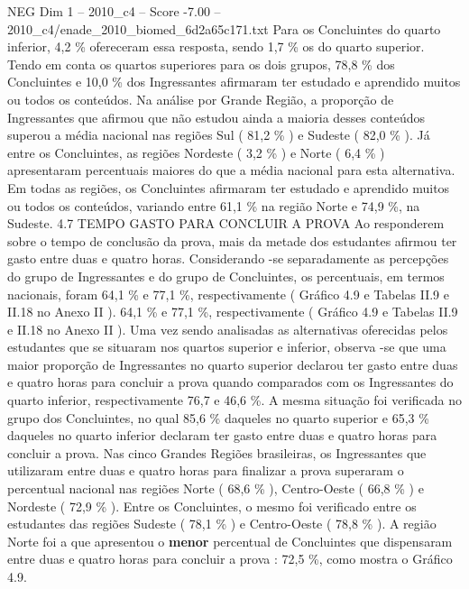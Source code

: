 \begin{textsample}{NEG Dim 1 – 2010\_c4 – Score -7.00 – 2010\_c4/enade\_2010\_biomed\_6d2a65c171.txt}
Para os Concluintes do quarto inferior, 4,2 \% ofereceram essa resposta, sendo 1,7 \% os do quarto superior.
Tendo em conta os quartos superiores para os dois grupos, 78,8 \% dos Concluintes e 10,0 \% dos Ingressantes afirmaram ter estudado e aprendido muitos ou todos os conteúdos.
Na análise por Grande Região, a proporção de Ingressantes que afirmou que não estudou ainda a maioria desses conteúdos superou a média nacional nas regiões Sul ( 81,2 \% ) e Sudeste ( 82,0 \% ).
Já entre os Concluintes, as regiões Nordeste ( 3,2 \% ) e Norte ( 6,4 \% ) apresentaram percentuais maiores do que a média nacional para esta alternativa.
Em todas as regiões, os Concluintes afirmaram ter estudado e aprendido muitos ou todos os conteúdos, variando entre 61,1 \% na região Norte e 74,9 \%, na Sudeste. 4.7 TEMPO GASTO PARA CONCLUIR A PROVA Ao responderem sobre o tempo de conclusão da prova, mais da metade dos estudantes afirmou ter gasto entre duas e quatro horas.
Considerando -se separadamente as percepções do grupo de Ingressantes e do grupo de Concluintes, os percentuais, em termos nacionais, foram 64,1 \% e 77,1 \%, respectivamente ( Gráfico 4.9 e Tabelas II.9 e II.18 no Anexo II ). 64,1 \% e 77,1 \%, respectivamente ( Gráfico 4.9 e Tabelas II.9 e II.18 no Anexo II ).
Uma vez sendo analisadas as alternativas oferecidas pelos estudantes que se situaram nos quartos superior e inferior, observa -se que uma maior proporção de Ingressantes no quarto superior declarou ter gasto entre duas e quatro horas para concluir a prova quando comparados com os Ingressantes do quarto inferior, respectivamente 76,7 e 46,6 \%.
A mesma situação foi verificada no grupo dos Concluintes, no qual 85,6 \% daqueles no quarto superior e 65,3 \% daqueles no quarto inferior declaram ter gasto entre duas e quatro horas para concluir a prova.
Nas cinco Grandes Regiões brasileiras, os Ingressantes que utilizaram entre duas e quatro horas para finalizar a prova superaram o percentual nacional nas regiões Norte ( 68,6 \% ), Centro-Oeste ( 66,8 \% ) e Nordeste ( 72,9 \% ).
Entre os Concluintes, o mesmo foi verificado entre os estudantes das regiões Sudeste ( 78,1 \% ) e Centro-Oeste ( 78,8 \% ).
A região Norte foi a que apresentou o \textbf{menor} percentual de Concluintes que dispensaram entre duas e quatro horas para concluir a prova : 72,5 \%, como mostra o Gráfico 4.9.

\end{textsample}
